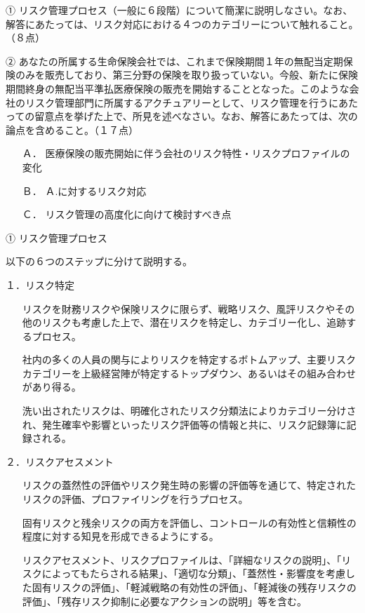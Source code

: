 \documentclass[report,gutter=10mm,fore-edge=10mm,uplatex,dvipdfmx]{jlreq}
\begin{document}
① リスク管理プロセス（一般に６段階）について簡潔に説明しなさい。なお、解答にあたっては、リスク対応における４つのカテゴリーについて触れること。（８点）

② あなたの所属する生命保険会社では、これまで保険期間１年の無配当定期保険のみを販売しており、第三分野の保険を取り扱っていない。今般、新たに保険期間終身の無配当平準払医療保険の販売を開始することとなった。このような会社のリスク管理部門に所属するアクチュアリーとして、リスク管理を行うにあたっての留意点を挙げた上で、所見を述べなさい。なお、解答にあたっては、次の論点を含めること。（１７点）

\begin{itemize}
\item[ Ａ．] 医療保険の販売開始に伴う会社のリスク特性・リスクプロファイルの変化
\item[ Ｂ．] Ａ.に対するリスク対応
\item[ Ｃ．] リスク管理の高度化に向けて検討すべき点
\end{itemize}
\answer{}
① リスク管理プロセス

以下の６つのステップに分けて説明する。

１．リスク特定
\begin{itemize}
\item[]  リスクを財務リスクや保険リスクに限らず、戦略リスク、風評リスクやその他のリスクも考慮した上で、潜在リスクを特定し、カテゴリー化し、追跡するプロセス。
\item[]  社内の多くの人員の関与によりリスクを特定するボトムアップ、主要リスクカテゴリーを上級経営陣が特定するトップダウン、あるいはその組み合わせがあり得る。
\item[]  洗い出されたリスクは、明確化されたリスク分類法によりカテゴリー分けされ、発生確率や影響といったリスク評価等の情報と共に、リスク記録簿に記録される。
\end{itemize}

２．リスクアセスメント
\begin{itemize}
\item[] リスクの蓋然性の評価やリスク発生時の影響の評価等を通じて、特定されたリスクの評価、プロファイリングを行うプロセス。
\item[] 固有リスクと残余リスクの両方を評価し、コントロールの有効性と信頼性の程度に対する知見を形成できるようにする。
\item[] リスクアセスメント、リスクプロファイルは、「詳細なリスクの説明」、「リスクによってもたらされる結果」、「適切な分類」、「蓋然性・影響度を考慮した固有リスクの評価」、「軽減戦略の有効性の評価」、「軽減後の残存リスクの評価」、「残存リスク抑制に必要なアクションの説明」等を含む。
\end{itemize}
\end{document}
